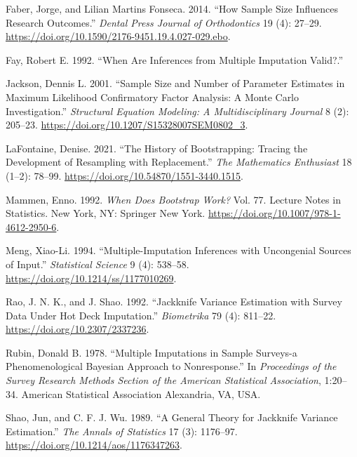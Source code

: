 \documentclass[
  letterpaper,
  DIV=11,
  numbers=noendperiod]{scrreprt}
\newlength{\cslhangindent}
\newlength{\cslentryspacingunit} %
\newenvironment{CSLReferences}[2] %
 {%
  \setlength{\parindent}{0pt}
  \ifodd #1
  \let\oldpar\par
  \def\par{\hangindent=\cslhangindent\oldpar}
  \fi
  \setlength{\parskip}{#2\cslentryspacingunit}
 }%
 {}
\begin{document}
\begin{CSLReferences}{1}{0}
\leavevmode{}%
Faber, Jorge, and Lilian Martins Fonseca. 2014. {``How Sample Size
Influences Research Outcomes.''} \emph{Dental Press Journal of
Orthodontics} 19 (4): 27--29.
\url{https://doi.org/10.1590/2176-9451.19.4.027-029.ebo}.

\leavevmode{}%
Fay, Robert E. 1992. {``When Are Inferences from Multiple Imputation
Valid?.''}

\leavevmode{}%
Jackson, Dennis L. 2001. {``Sample Size and Number of Parameter
Estimates in Maximum Likelihood Confirmatory Factor Analysis: A Monte
Carlo Investigation.''} \emph{Structural Equation Modeling: A
Multidisciplinary Journal} 8 (2): 205--23.
\url{https://doi.org/10.1207/S15328007SEM0802_3}.

\leavevmode{}%
LaFontaine, Denise. 2021. {``The History of Bootstrapping: Tracing the
Development of Resampling with Replacement.''} \emph{The Mathematics
Enthusiast} 18 (1--2): 78--99.
\url{https://doi.org/10.54870/1551-3440.1515}.

\leavevmode{}%
Mammen, Enno. 1992. \emph{When Does Bootstrap Work?} Vol. 77. Lecture
Notes in Statistics. New York, NY: Springer New York.
\url{https://doi.org/10.1007/978-1-4612-2950-6}.

\leavevmode{}%
Meng, Xiao-Li. 1994. {``Multiple-Imputation Inferences with Uncongenial
Sources of Input.''} \emph{Statistical Science} 9 (4): 538--58.
\url{https://doi.org/10.1214/ss/1177010269}.

\leavevmode{}%
Rao, J. N. K., and J. Shao. 1992. {``Jackknife Variance Estimation with
Survey Data Under Hot Deck Imputation.''} \emph{Biometrika} 79 (4):
811--22. \url{https://doi.org/10.2307/2337236}.

\leavevmode{}%
Rubin, Donald B. 1978. {``Multiple Imputations in Sample Surveys-a
Phenomenological Bayesian Approach to Nonresponse.''} In
\emph{Proceedings of the Survey Research Methods Section of the American
Statistical Association}, 1:20--34. American Statistical Association
Alexandria, VA, USA.

\leavevmode{}%
Shao, Jun, and C. F. J. Wu. 1989. {``A General Theory for Jackknife
Variance Estimation.''} \emph{The Annals of Statistics} 17 (3):
1176--97. \url{https://doi.org/10.1214/aos/1176347263}.


\end{CSLReferences}
\end{document}
